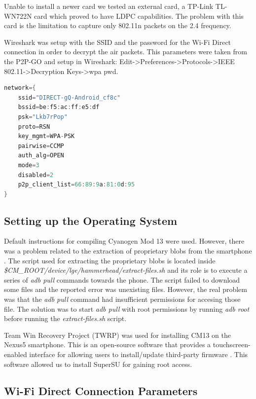 Unable to install a newer card we tested an external card, a TP-Link TL-WN722N card \cite{cite-tplink} which proved to have LDPC capabilities. The problem with this card is the limitation to capture only 802.11n packets on the 2.4 frequency.

Wireshark was setup with the SSID and the password for the Wi-Fi Direct connection in order to decrypt the air packets. This parameters were taken from the P2P-GO and setup in Wireshark: Edit->Preferences->Protocols->IEEE 802.11->Decryption Keys->wpa pwd.

\begin{lstlisting}[language=C, frame=single, caption={Listing from /data/misc/wifi/p2p_supplicant.conf on the P2P GO},label=p2p_supplicant]
network={
	ssid="DIRECT-gQ-Android_cf8c"
	bssid=be:f5:ac:ff:e5:df
	psk="Lkb7rPop"
	proto=RSN
	key_mgmt=WPA-PSK
	pairwise=CCMP
	auth_alg=OPEN
	mode=3
	disabled=2
	p2p_client_list=66:89:9a:81:0d:95
}
\end{lstlisting}

\subsection{Setting up the Operating System}
\label{sub-sec:proj-scopenexus5operatingsystem}

Default instructions \cite{cite-compilingcm13} for compiling Cyanogen Mod 13 were used. However, there was a problem related to the extraction of proprietary blobs from the smartphone \cite{cite-proprietaryblobs}. The script used for extracting the proprietary blobs is located inside \textit{\$CM_ROOT/device/lge/hammerhead/extract-files.sh} and its role is to execute a series of \textit{adb pull} commands towards the phone. The script failed to download some files and the reported error was unexisting files. However, the real problem was that the \textit{adb pull} command had insufficient permissions for accesing those file. The solution was to start \textit{adb pull} with root permissions by running \textit{adb root} before running the \textit{extract-files.sh} script.

Team Win Recovery Project (TWRP) was used for installing CM13 on the Nexus5 smartphone. This is an open-source software that provides a touchscreen-enabled interface for allowing users to install/update third-party firmware \cite{cite-twrp}. This software allowed us to install SuperSU for gaining root access.

\subsection{Wi-Fi Direct Connection Parameters}
\label{sub-sec:proj-scopep2pconnectionsectup}

